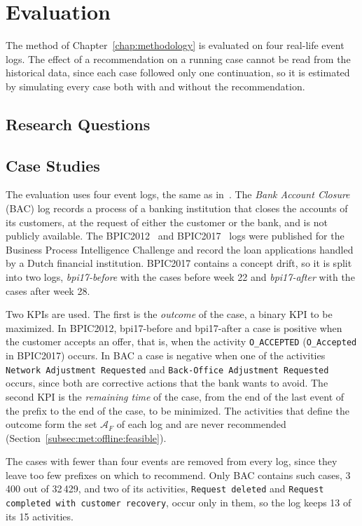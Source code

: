 \chapter{Evaluation}
\label{chap:evaluation}
The method of Chapter~\ref{chap:methodology} is evaluated on four real-life
event logs. The effect of a recommendation on a running case cannot be read
from the historical data, since each case followed only one continuation, so
it is estimated by simulating every case both with and without the
recommendation.


\section{Research Questions}
\label{sec:ev:rq}


\section{Case Studies}
\label{sec:ev:cases}
The evaluation uses four event logs, the same as in~\cite{le2025balancing}.
The \emph{Bank Account Closure} (BAC) log records a process of a banking
institution that closes the accounts of its customers, at the request of
either the customer or the bank, and is not publicly available. The
BPIC2012~\cite{bpic2012} and BPIC2017~\cite{bpic2017} logs were published for
the Business Process Intelligence Challenge and record the loan applications
handled by a Dutch financial institution. BPIC2017 contains a concept drift,
so it is split into two logs, \emph{bpi17-before} with the cases before week
22 and \emph{bpi17-after} with the cases after week 28.

Two KPIs are used. The first is the \emph{outcome} of the case, a binary KPI
to be maximized. In BPIC2012, bpi17-before and bpi17-after a case is positive
when the customer accepts an offer, that is, when the activity
\texttt{O\_ACCEPTED} (\texttt{O\_Accepted} in BPIC2017) occurs. In BAC a case
is negative when one of the activities \texttt{Network Adjustment Requested}
and \texttt{Back-Office Adjustment Requested} occurs, since both are
corrective actions that the bank wants to avoid. The second KPI is the
\emph{remaining time} of the case, from the end of the last event of the
prefix to the end of the case, to be minimized. The activities that define
the outcome form the set $\mathcal{A}_F$ of each log and are never
recommended (Section~\ref{subsec:met:offline:feasible}).

The cases with fewer than four events are removed from every log, since they
leave too few prefixes on which to recommend. Only BAC contains such cases,
3\,400 out of 32\,429, and two of its activities, \texttt{Request deleted}
and \texttt{Request completed with customer recovery}, occur only in them,
so the log keeps 13 of its 15 activities.

